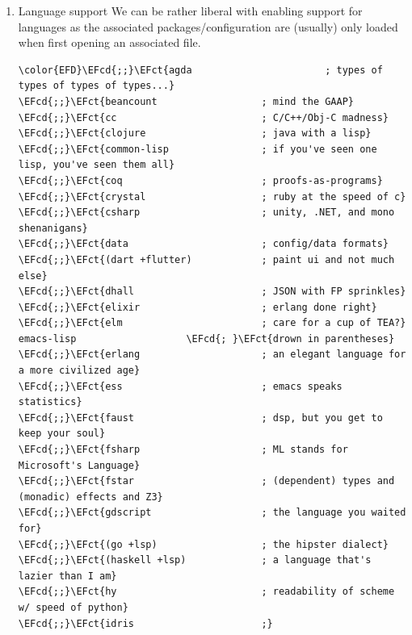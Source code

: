 \documentclass{scrartcl}
\newcommand{\EFb}[1]{\textcolor{EFb}{#1}} %
\newcommand{\EFct}[1]{\textcolor{EFct}{#1}} %
\newcommand{\EFv}[1]{\textcolor{EFv}{#1}} %
\newcommand{\EFcd}[1]{\textcolor{EFcd}{#1}} %
\newcommand{\EFrdi}[1]{#1} %
\begin{document}
\begin{enumerate}
\begin{Code}
\begin{Verbatim}[]
\color{EFD}\EFrdi{(}\EFb{:if} \EFv{IS-MAC} macos\EFrdi{)}           \EFcd{; }\EFct{improve compatibility with macOS}
\EFcd{;;}\EFct{tty                        ; improve the terminal Emacs experience}
\end{Verbatim}
\end{Code}

\item Language support
\label{sec:org9f39b37}
We can be rather liberal with enabling support for languages as the associated
packages/configuration are (usually) only loaded when first opening an
associated file.

\begin{Code}
\begin{Verbatim}[]
\color{EFD}\EFcd{;;}\EFct{agda                       ; types of types of types of types...}
\EFcd{;;}\EFct{beancount                  ; mind the GAAP}
\EFcd{;;}\EFct{cc                         ; C/C++/Obj-C madness}
\EFcd{;;}\EFct{clojure                    ; java with a lisp}
\EFcd{;;}\EFct{common-lisp                ; if you've seen one lisp, you've seen them all}
\EFcd{;;}\EFct{coq                        ; proofs-as-programs}
\EFcd{;;}\EFct{crystal                    ; ruby at the speed of c}
\EFcd{;;}\EFct{csharp                     ; unity, .NET, and mono shenanigans}
\EFcd{;;}\EFct{data                       ; config/data formats}
\EFcd{;;}\EFct{(dart +flutter)            ; paint ui and not much else}
\EFcd{;;}\EFct{dhall                      ; JSON with FP sprinkles}
\EFcd{;;}\EFct{elixir                     ; erlang done right}
\EFcd{;;}\EFct{elm                        ; care for a cup of TEA?}
emacs-lisp                   \EFcd{; }\EFct{drown in parentheses}
\EFcd{;;}\EFct{erlang                     ; an elegant language for a more civilized age}
\EFcd{;;}\EFct{ess                        ; emacs speaks statistics}
\EFcd{;;}\EFct{faust                      ; dsp, but you get to keep your soul}
\EFcd{;;}\EFct{fsharp                     ; ML stands for Microsoft's Language}
\EFcd{;;}\EFct{fstar                      ; (dependent) types and (monadic) effects and Z3}
\EFcd{;;}\EFct{gdscript                   ; the language you waited for}
\EFcd{;;}\EFct{(go +lsp)                  ; the hipster dialect}
\EFcd{;;}\EFct{(haskell +lsp)             ; a language that's lazier than I am}
\EFcd{;;}\EFct{hy                         ; readability of scheme w/ speed of python}
\EFcd{;;}\EFct{idris                      ;}

\end{Verbatim}
\end{Code}
\end{enumerate}
\end{document}
